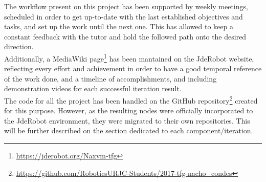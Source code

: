 The workflow present on this project has been supported by weekly meetings, scheduled in order to get up-to-date with the last established objectives and tasks, and set up the work until the next one. This has allowed to keep a constant feedback with the tutor and hold the followed path onto the desired direction.\\

Additionally, a MediaWiki page\footnote{\url{https://jderobot.org/Naxvm-tfg}} has been mantained on the JdeRobot website, reflecting every effort and achievement in order to have a good temporal reference of the work done, and a timeline of accomplishments, and including demonstration videos for each successful iteration result.\\

The code for all the project has been handled on the GitHub repository\footnote{\url{https://github.com/RoboticsURJC-Students/2017-tfg-nacho\_condes}} created for this purpose. However, as the resulting nodes were officially incorporated to the JdeRobot environment, they were migrated to their own repositories. This will be further described on the section dedicated to each component/iteration.\\
